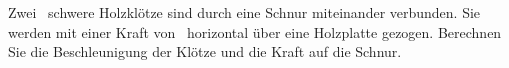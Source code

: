 Zwei \mHkO\ schwere Holzklötze sind durch eine Schnur miteinander verbunden. Sie werden mit einer Kraft von \FZuO\ horizontal über eine Holzplatte gezogen. Berechnen Sie die Beschleunigung der Klötze und die Kraft auf die Schnur.
